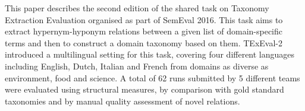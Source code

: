 This paper describes the second edition of the shared task on Taxonomy Extraction Evaluation organised as part of SemEval 2016. This task aims to extract hypernym-hyponym relations between a given list of domain-specific terms and then to construct a domain taxonomy based on them. TExEval-2 introduced a multilingual setting for this task, covering four different languages including English, Dutch, Italian and French from domains as diverse as environment, food and science. A total of 62 runs submitted by 5 different teams were evaluated using structural measures, by comparison with gold standard taxonomies and by manual quality assessment of novel relations.
